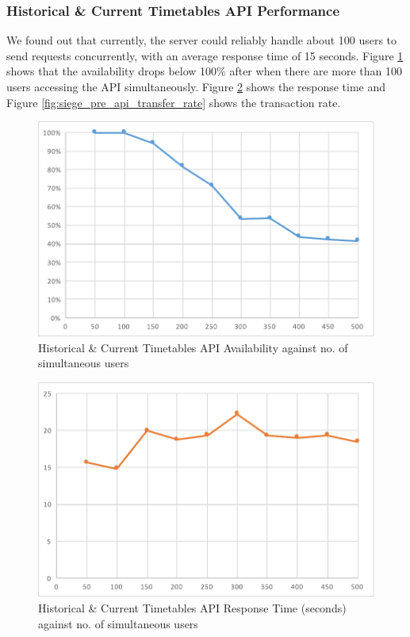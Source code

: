 \subsubsection{Historical \& Current Timetables API Performance}

\par We found out that currently, the server could reliably handle about 100 users to send requests concurrently, with an average response time of 15 seconds. Figure \ref{fig:siege_pre_api_availability} shows that the availability drops below 100\% after when there are more than 100 users accessing the API simultaneously. Figure \ref{fig:siege_pre_api_response_time} shows the response time and Figure \ref{fig:siege_pre_api_transfer_rate} shows the transaction rate.

\begin{figure}
\centering
\includegraphics[width=\textwidth]{figures/siege_predictions_api_availability_against_users.pdf}
\caption{\label{fig:siege_pre_api_availability} Historical \& Current Timetables API Availability against no. of simultaneous users}
\end{figure}

\begin{figure}
\centering
\includegraphics[width=\textwidth]{figures/siege_predictions_api_response_time_against_users.pdf}
\caption{\label{fig:siege_pre_api_response_time} Historical \& Current Timetables API Response Time (seconds) against no. of simultaneous users}
\end{figure}

